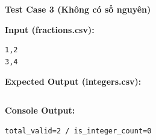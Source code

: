 \vspace{0.5cm}

\textbf{Test Case 3 (Không có số nguyên)}

\textbf{Input (fractions.csv):}
\begin{lstlisting}
1,2
3,4
\end{lstlisting}

\textbf{Expected Output (integers.csv):}
\begin{lstlisting}

\end{lstlisting}

\textbf{Console Output:}
\begin{lstlisting}
total_valid=2 / is_integer_count=0
\end{lstlisting}